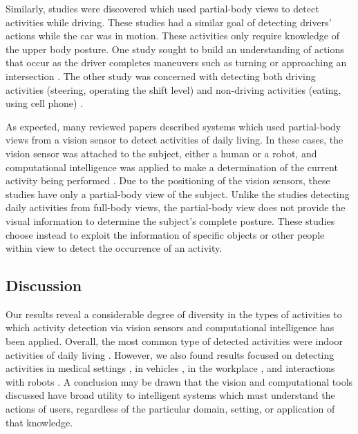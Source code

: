 \documentclass[12pt]{report}
\begin{document}
Similarly, studies were discovered which used partial-body views to detect activities while driving. These studies had a similar goal of detecting drivers’ actions while the car was in motion. These activities only require knowledge of the upper body posture. One study sought to build an understanding of actions that occur as the driver completes maneuvers such as turning or approaching an intersection \cite{Martin2017}. The other study was concerned with detecting both driving activities (steering, operating the shift level) and non-driving activities (eating, using cell phone) \cite{Zhao2012}.

As expected, many reviewed papers described systems which used partial-body views from a vision sensor to detect activities of daily living. In these cases, the vision sensor was attached to the subject, either a human or a robot, and computational intelligence was applied to make a determination of the current activity being performed \cite{Li2016, Wu2007}. Due to the positioning of the vision sensors, these studies have only a partial-body view of the subject. Unlike the studies detecting daily activities from full-body views, the partial-body view does not provide the visual information to determine the subject’s complete posture. These studies choose instead to exploit the information of specific objects \cite{Pirsiavash2012, Wu2007, McCandless2013, Nakatani2019} or other people within view \cite{Li2016} to detect the occurrence of an activity.

\subsection{Discussion}
Our results reveal a considerable degree of diversity in the types of activities to which activity detection via vision sensors and computational intelligence has been applied. Overall, the most common type of detected activities were indoor activities of daily living \cite{McIlwraith2009, Wu2007, Yao2016, McIlwraith2008, ElHelw2009, Rowe2007, Figueroa-Angulo2013, Mahabalagiri2013, Ong2013, Li2016, McCandless2013, Nakatani2019}. However, we also found results focused on detecting activities in medical settings \cite{Chakraborty2013, Bloisi2009}, in vehicles \cite{Zhao2012, Martin2017}, in the workplace \cite{Hamid2005}, and interactions with robots \cite{Yoshida2010}. A conclusion may be drawn that the vision and computational tools discussed have broad utility to intelligent systems which must understand the actions of users, regardless of the particular domain, setting, or application of that knowledge.
\end{document}
